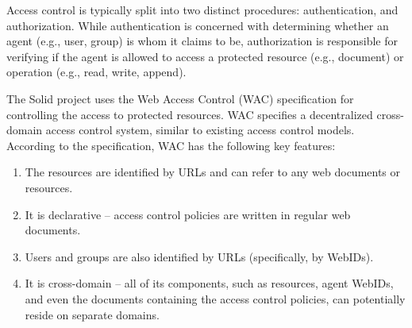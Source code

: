 \documentclass[sigconf]{acmart}
\begin{document}
Access control is typically split into two distinct procedures: authentication, and authorization. While authentication is concerned with determining whether an agent (e.g., user, group) is whom it claims to be, authorization is responsible for verifying if the agent is allowed to access a protected resource (e.g., document) or operation (e.g., read, write, append).

The Solid project uses the Web Access Control (WAC) specification for controlling the access to protected resources. WAC specifies a decentralized cross-domain access control system, similar to existing access control models. According to the specification, WAC has the following key features:

\begin{enumerate}
\item The resources are identified by URLs and can refer to any web documents or resources.
\item It is declarative -- access control policies are written in regular web documents.
\item Users and groups are also identified by URLs (specifically, by WebIDs).
\item It is cross-domain -- all of its components, such as resources, agent WebIDs, and even the documents containing the access control policies, can potentially reside on separate domains.
\end{enumerate}
\end{document}
